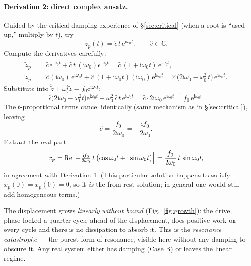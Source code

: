\documentclass[11pt]{article}
\theoremstyle{plain}
\theoremstyle{definition}
\theoremstyle{remark}
\newcommand{\ee}{\mathrm{e}}
\newcommand{\ii}{\mathrm{i}}
\newcommand{\Rre}{\operatorname{Re}}
\begin{document}
\paragraph{Derivation 2: direct complex ansatz.}
Guided by the critical-damping experience of \S\ref{sec:critical} (when a
root is ``used up,'' multiply by $t$), try
\begin{equation}
  \tilde z_p(t) = \hat c\,t\,\ee^{\ii\omega_0 t}, \qquad \hat c\in\mathbb{C}.
\end{equation}
Compute the derivatives carefully:
\begin{align}
  \dot{\tilde z}_p &= \hat c\,\ee^{\ii\omega_0 t} + \hat c\,t\,(\ii\omega_0)\ee^{\ii\omega_0 t}
            = \hat c\,(1 + \ii\omega_0 t)\,\ee^{\ii\omega_0 t},\\
  \ddot{\tilde z}_p &= \hat c\,(\ii\omega_0)\,\ee^{\ii\omega_0 t}
             + \hat c\,(1+\ii\omega_0 t)(\ii\omega_0)\,\ee^{\ii\omega_0 t}
            = \hat c\,\bigl(2\ii\omega_0 - \omega_0^2\, t\bigr)\,\ee^{\ii\omega_0 t}.
\end{align}
Substitute into $\ddot{\tilde z} + \omega_0^2 \tilde z = f_0\ee^{\ii\omega_0 t}$:
\begin{equation}
  \hat c\bigl(2\ii\omega_0 - \omega_0^2 t\bigr)\ee^{\ii\omega_0 t}
  + \omega_0^2\, \hat c\, t\, \ee^{\ii\omega_0 t}
  = \hat c\cdot 2\ii\omega_0\,\ee^{\ii\omega_0 t}
  \overset{!}{=} f_0\,\ee^{\ii\omega_0 t}.
\end{equation}
The $t$-proportional terms cancel identically (same mechanism as in
\S\ref{sec:critical}), leaving
\begin{equation}
  \hat c = \frac{f_0}{2\ii\omega_0} = -\frac{\ii f_0}{2\omega_0}.
\end{equation}
Extract the real part:
\begin{equation}
  x_p = \Rre\Bigl[-\tfrac{\ii f_0}{2\omega_0}\,t\,
        \bigl(\cos\omega_0 t + \ii \sin\omega_0 t\bigr)\Bigr]
      = \frac{f_0}{2\omega_0}\,t\,\sin\omega_0 t ,
\end{equation}
in agreement with Derivation 1. (This particular solution happens to satisfy
$x_p(0)=\dot x_p(0)=0$, so it \emph{is} the from-rest solution; in general
one would still add homogeneous terms.)

The displacement grows \emph{linearly without bound}
(Fig.~\ref{fig:growth}): the drive, phase-locked a quarter cycle ahead of the
displacement, does positive work on every cycle and there is no dissipation
to absorb it. This is the \emph{resonance catastrophe} --- the purest form of
resonance, visible here without any damping to obscure it. Any real system
either has damping (Case B) or leaves the linear regime.
\end{document}
